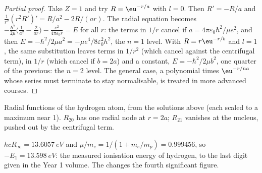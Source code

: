 \begin{proof}[Partial proof]
Take $Z = 1$ and try $R = \eu^{-r/a}$ with $l = 0$. Then $R' = -R/a$ and
$\frac{1}{r^2}(r^2R')' = R/a^2 - 2R/(ar)$. The radial equation becomes
$-\frac{\hbar^2}{2\mu}\big(\frac{1}{a^2} - \frac{2}{ar}\big) - \frac{e^2}{4\pi
\varepsilon_0r} = E$ for all $r$: the terms in $1/r$ cancel if $a =
4\pi\varepsilon_0\hbar^2/\mu e^2$, and then $E = -\hbar^2/2\mu a^2 = -\mu
e^4/8\varepsilon_0^2h^2$, the $n = 1$ level. With $R = r\eu^{-r/b}$ and $l = 1$,
the same substitution leaves terms in $1/r^2$ (which cancel against the
centrifugal term), in $1/r$ (which cancel if $b = 2a$) and a constant, $E =
-\hbar^2/2\mu b^2$, one quarter of the previous: the $n = 2$ level. The general
case, a polynomial times $\eu^{-r/na}$ whose series must terminate to stay
normalisable, is treated in more advanced courses.
\end{proof}

\begin{omfigure}

{\small Radial functions of the hydrogen atom, from the solutions above
(each scaled to a maximum near 1). $R_{20}$ has one radial node at $r = 2a$;
$R_{21}$ vanishes at the nucleus, pushed out by the centrifugal term.}
\end{omfigure}

\begin{example}\label{ex:b3:quantum-model-systems:ie}
$hcR_\infty = \qty{13.6057}{eV}$ and $\mu/m_e = 1/(1 + m_e/m_p) = 0.999456$, so
$-E_1 = \qty{13.598}{eV}$: the measured ionisation energy of hydrogen, to the
last digit given in the Year 1 volume. The  changes the fourth
significant figure.
\end{example}

